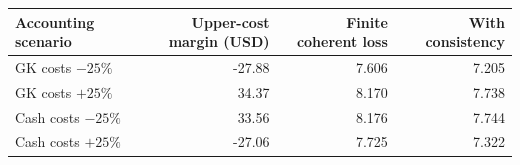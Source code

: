 \begin{tabular}{lrrr}
\toprule
Accounting scenario & Upper-cost margin (USD) & Finite coherent loss & With consistency \\
\midrule
GK costs $-25\%$ & -27.88 & 7.606 & 7.205 \\
GK costs $+25\%$ & 34.37 & 8.170 & 7.738 \\
Cash costs $-25\%$ & 33.56 & 8.176 & 7.744 \\
Cash costs $+25\%$ & -27.06 & 7.725 & 7.322 \\
\bottomrule
\end{tabular}
